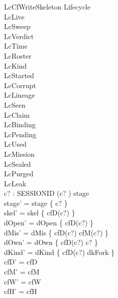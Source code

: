 \documentclass[a4paper,10pt,fleqn]{article}
\begin{document}
\begin{schema}{LcCfWriteSkeleton}
\Delta Lifecycle \\
\Xi LcLive \\
\Xi LcSweep \\
\Xi LcVerdict \\
\Xi LcTime \\
\Xi LcRoster \\
\Xi LcKind \\
\Xi LcStarted \\
\Xi LcCorrupt \\
\Xi LcLineage \\
\Xi LcSeen \\
\Xi LcClaim \\
\Xi LcBinding \\
\Xi LcPending \\
\Xi LcUsed \\
\Xi LcMission \\
\Xi LcSealed \\
\Xi LcPurged \\
\Xi LcLeak \\
c? : SESSIONID
\where
(c? ) \in stage \\
stage' = stage \oplus \{ c?  \} \\
skel' = skel \cup \{ cfD(c?) \} \\
dOpen' = dOpen \cup \{ cfD(c?) \} \\
dMis' = dMis \oplus \{ cfD(c?) \mapsto cfM(c?) \} \\
dOwn' = dOwn \oplus \{ cfD(c?) \mapsto c? \} \\
dKind' = dKind \oplus \{ cfD(c?) \mapsto dkFork \} \\
cfD' = cfD \\
cfM' = cfM \\
cfW' = cfW \\
cfH' = cfH
\end{schema}
\end{document}
